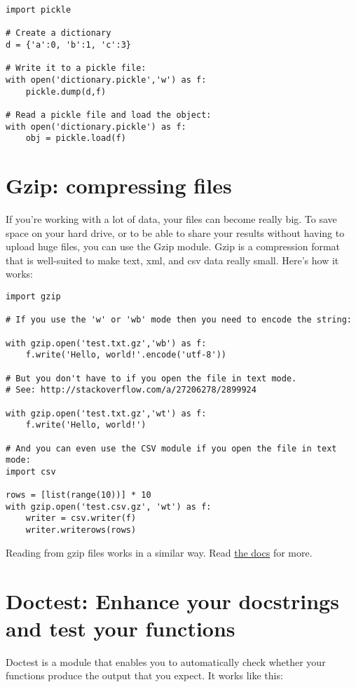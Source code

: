 \documentclass[12pt]{book}
\begin{document}
\begin{lstlisting}
import pickle

# Create a dictionary
d = {'a':0, 'b':1, 'c':3}

# Write it to a pickle file:
with open('dictionary.pickle','w') as f:
    pickle.dump(d,f)

# Read a pickle file and load the object:
with open('dictionary.pickle') as f:
    obj = pickle.load(f)
\end{lstlisting}

\section{Gzip: compressing files}

If you're working with a lot of data, your files can become really big. To save space on your hard drive, or to be able to share your results without having to upload huge files, you can use the Gzip module. Gzip is a compression format that is well-suited to make text, xml, and csv data really small. Here's how it works:

\begin{lstlisting}
import gzip

# If you use the 'w' or 'wb' mode then you need to encode the string:

with gzip.open('test.txt.gz','wb') as f:
    f.write('Hello, world!'.encode('utf-8'))

# But you don't have to if you open the file in text mode.
# See: http://stackoverflow.com/a/27206278/2899924

with gzip.open('test.txt.gz','wt') as f:
    f.write('Hello, world!')

# And you can even use the CSV module if you open the file in text mode:
import csv

rows = [list(range(10))] * 10
with gzip.open('test.csv.gz', 'wt') as f:
    writer = csv.writer(f)
    writer.writerows(rows)
\end{lstlisting}

Reading from gzip files works in a similar way. Read \href{https://docs.python.org/3/library/gzip.html}{the docs} for more.

\section{Doctest: Enhance your docstrings and test your functions}

Doctest is a module that enables you to automatically check whether your functions produce the output that you expect. It works like this:
\end{document}
